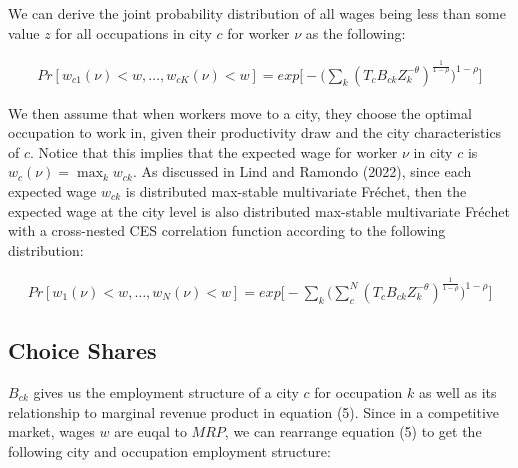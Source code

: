 \documentclass[10pt]{article}
\begin{document}
We can derive the joint probability distribution of all wages being less than some value $z$ for all occupations in city $c$ for worker $\nu$ as the following:

\begin{align}
    {Pr}[w_{c1}(\nu) < w, \dots, w_{cK}(\nu) < w] = {exp}\Big[-\Big(\sum_{k}({T_{c}}{B_{ck}}{Z_k^{-\theta}})^{\frac{1}{1 - \rho}}\Big)^{1 - \rho}\Big]
\end{align}

We then assume that when workers move to a city, they choose the optimal occupation to work in, given their productivity draw and the city characteristics of $c$. Notice that this implies that the expected wage for worker $\nu$ in city $c$ is $w_{c}(\nu) = \max_{k}{w_{ck}}$. As discussed in Lind and Ramondo (2022), since each expected wage $w_{ck}$ is distributed max-stable multivariate Fréchet, then the expected wage at the city level is also distributed max-stable multivariate Fréchet with a cross-nested CES correlation function according to the following distribution:

\begin{align}
    {Pr}[w_{1}(\nu) < w, \dots, w_{N}(\nu) < w] = {exp}\Big[-\sum_{k}\Big(\sum_{c}^{N}({T_{c}}{B_{ck}}{Z_k^{-\theta}})^{\frac{1}{1 - \rho}}\Big)^{1 - \rho}\Big]
\end{align}






\subsection{Choice Shares}

$B_{ck}$ gives us the employment structure of a city $c$ for occupation $k$ as well as its relationship to marginal revenue product in equation (5). Since in a competitive market, wages $w$ are euqal to $MRP$, we can rearrange equation (5) to get the following city and occupation employment structure:
\end{document}
